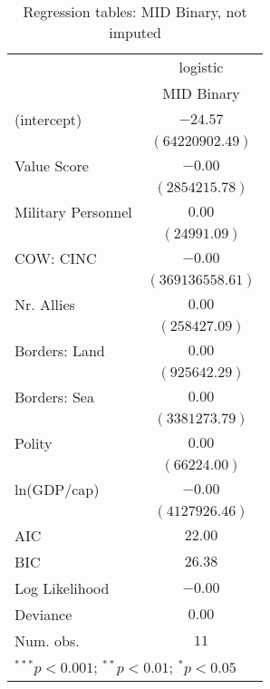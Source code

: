 
\begin{table}
\begin{center}
\begin{tabular}{l c}
\toprule
 & \multicolumn{1}{c}{logistic} \\
\cmidrule(lr){2-2}
 & MID Binary \\
\midrule
(intercept)        & $-24.57$         \\
                   & $(64220902.49)$  \\
Value Score        & $-0.00$          \\
                   & $(2854215.78)$   \\
Military Personnel & $0.00$           \\
                   & $(24991.09)$     \\
COW: CINC          & $-0.00$          \\
                   & $(369136558.61)$ \\
Nr. Allies         & $0.00$           \\
                   & $(258427.09)$    \\
Borders: Land      & $0.00$           \\
                   & $(925642.29)$    \\
Borders: Sea       & $0.00$           \\
                   & $(3381273.79)$   \\
Polity             & $0.00$           \\
                   & $(66224.00)$     \\
ln(GDP/cap)        & $-0.00$          \\
                   & $(4127926.46)$   \\
\midrule
AIC                & $22.00$          \\
BIC                & $26.38$          \\
Log Likelihood     & $-0.00$          \\
Deviance           & $0.00$           \\
Num. obs.          & $11$             \\
\bottomrule
\multicolumn{2}{l}{\scriptsize{$^{***}p<0.001$; $^{**}p<0.01$; $^{*}p<0.05$}}
\end{tabular}
\caption{Regression tables: MID Binary, not imputed}
\label{MIDni}
\end{center}
\end{table}

